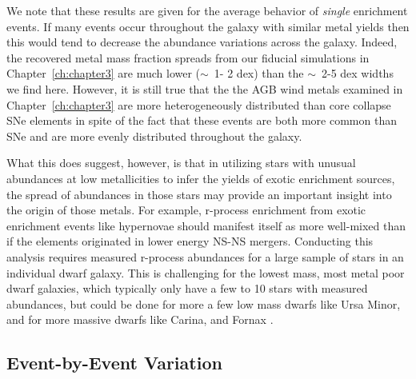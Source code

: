 We note that these results are given for the average behavior of \textit{single} enrichment events. If many events occur throughout the galaxy with similar metal yields then this would tend to decrease the abundance variations across the galaxy. Indeed, the recovered metal mass fraction spreads from our fiducial simulations in Chapter~\ref{ch:chapter3} are much lower ($\sim$~1- 2 dex) than the $\sim$~2-5 dex widths we find here. However, it is still true that the the AGB wind metals examined in Chapter~\ref{ch:chapter3} are more heterogeneously distributed than core collapse SNe elements in spite of the fact that these events are both more common than SNe and are more evenly distributed throughout the galaxy.

What this does suggest, however, is that in utilizing stars with unusual abundances at low metallicities to infer the yields of exotic enrichment sources, the spread of abundances in those stars may provide an important insight into the origin of those metals. For example, r-process enrichment from exotic enrichment events like hypernovae should manifest itself as more well-mixed than if the elements originated in lower energy NS-NS mergers. Conducting this analysis requires measured r-process abundances for a large sample of stars in an individual dwarf galaxy. This is challenging for the lowest mass, most metal poor dwarf galaxies, which typically only have a few to 10 stars with measured abundances, but could be done for more a few low mass dwarfs like Ursa Minor, and for more massive dwarfs like Carina, and Fornax \citep{Suda2017}.


\subsection{Event-by-Event Variation}
\label{ch4:sec:individual event variation}

